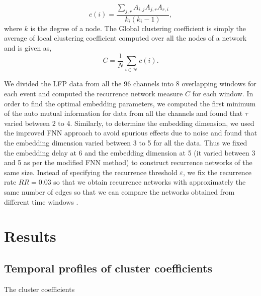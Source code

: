 \documentclass[a4paper]{jpconf}
\begin{document}
\begin{equation}
c(i)=\frac{\sum_{j,r}A_{i,j}A_{j,r}A_{r,i}}{k_{i}(k_{i}-1)},
\end{equation}
where $k$ is the degree of a node. The Global clustering coefficient is simply the average of local clustering coefficient computed over all the nodes of a network and is given as,
\begin{equation}
C= \frac{1}{N}\sum_{i\in\mathcal{N}}c(i).
\end{equation}



We divided the LFP data from all the 96 channels into 8 overlapping windows for each event and computed the recurrence network measure $C$ for each window. In order to find the optimal embedding parameters, we computed the first minimum of the auto mutual information for data from all the channels and found that $\tau$ varied between 2 to 4. Similarly, to determine the embedding dimension, we used the improved FNN approach \cite{hegger1999improved} to avoid spurious effects due to noise and found that the embedding dimension varied between 3 to 5 for all the data. Thus we fixed the embedding delay at 6 and the embedding dimension at 5 (it varied between 3 and 5 as per the modified FNN method) to construct recurrence networks of the same size. Instead of specifying the recurrence threshold $\varepsilon$, we fix the recurrence rate $RR = 0.03$ so that we obtain recurrence networks with approximately the same number of edges so that we can compare the networks obtained from different time windows \cite{donner2011recurrence}. 

\section{Results}
\label{sec:results}

\subsection{Temporal profiles of cluster coefficients}
The cluster coefficients 
\end{document}
